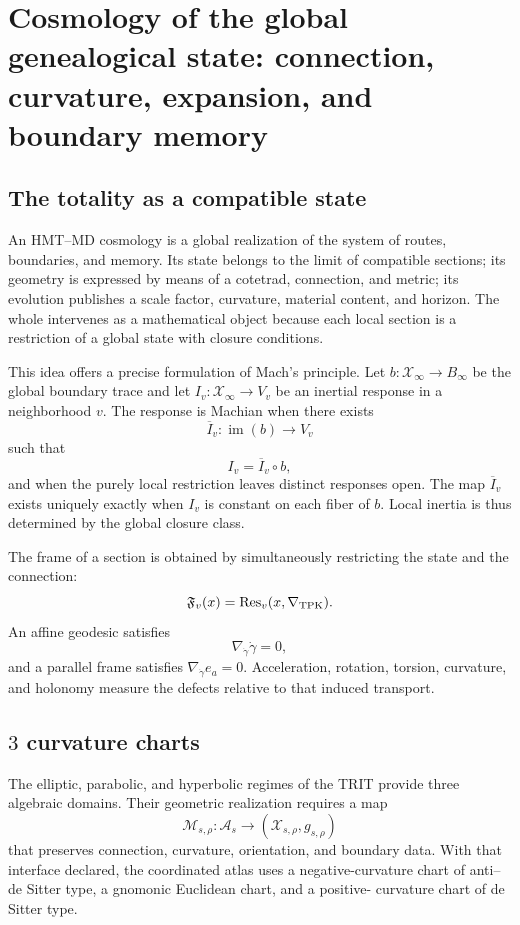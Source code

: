 \chapter{Cosmology of the global genealogical state: connection, curvature, expansion, and boundary memory}
\label{chap:cosmologia}

\section{The totality as a compatible state}

An HMT--MD cosmology is a global realization of the system of routes,
boundaries, and memory. Its state belongs to the limit of compatible sections;
its geometry is expressed by means of a cotetrad, connection, and metric; its evolution
publishes a scale factor, curvature, material content, and horizon. The
whole intervenes as a mathematical object because each local section is a
restriction of a global state with closure conditions.

This idea offers a precise formulation of Mach's principle. Let
\(b:\mathcal X_\infty\to B_\infty\) be the global boundary trace and let
\(I_v:\mathcal X_\infty\to V_v\) be an inertial response in a neighborhood
\(v\). The response is Machian when there exists
\[
 \overline I_v:\operatorname{im}(b)\to V_v
\]
such that
\[
 I_v=\overline I_v\circ b,
\]
and when the purely local restriction leaves distinct responses open.
The map \(\overline I_v\) exists uniquely exactly when
\(I_v\) is constant on each fiber of \(b\). Local inertia is thus
determined by the global closure class.

The frame of a section is obtained by simultaneously restricting the state and
the connection:
\[
 \mathfrak F_v(x)
 =\operatorname{Res}_v(x,\nabla_{\rm TPK}).
\]
An affine geodesic satisfies
\[
 \nabla_{\dot\gamma}\dot\gamma=0,
\]
and a parallel frame satisfies
\(\nabla_{\dot\gamma}e_a=0\). Acceleration, rotation, torsion, curvature, and
holonomy measure the defects relative to that induced transport.

\section{\(3\) curvature charts}

The elliptic, parabolic, and hyperbolic regimes of the TRIT provide three
algebraic domains. Their geometric realization requires a map
\[
 \mathcal M_{s,\rho}:\mathcal A_s
 \longrightarrow(\mathcal X_{s,\rho},g_{s,\rho})
\]
that preserves connection, curvature, orientation, and boundary data. With that
interface declared, the coordinated atlas uses a negative-curvature
chart of anti--de Sitter type, a gnomonic Euclidean chart, and a positive-
curvature chart of de Sitter type.

